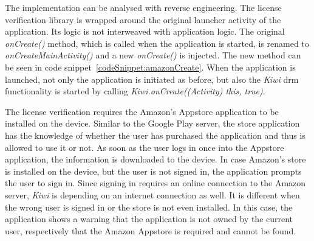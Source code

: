 \newline
The implementation can be analysed with reverse engineering.
The license verification library is wrapped around the original launcher activity of the application.
Its logic is not interweaved with application logic.
The original \textit{onCreate()} method, which is called when the application is started, is renamed to \textit{onCreateMainActivity()} and a new \textit{onCreate()} is injected.
The new method can be seen in code snippet~\ref{codeSnippet:amazonCreate}.
When the application is launched, not only the application is initiated as before, but also the \textit{Kiwi} \gls{drm} functionality is started by calling \textit{Kiwi.onCreate((Activity) this, true)}.
\newline

\newpage
The license verification requires the Amazon's Appstore application to be installed on the device.
Similar to the Google Play server, the store application has the knowledge of whether the user has purchased the application and thus is allowed to use it or not.
As soon as the user logs in once into the Appstore application, the information is downloaded to the device.
In case Amazon's store is installed on the device, but the user is not signed in, the application prompts the user to sign in.
Since signing in requires an online connection to the Amazon server, \textit{Kiwi} is depending on an internet connection as well.
It is different when the wrong user is signed in or the store is not even installed.
In this case, the application shows a warning that the application is not owned by the current user, respectively that the Amazon Appstore is required and cannot be found.
